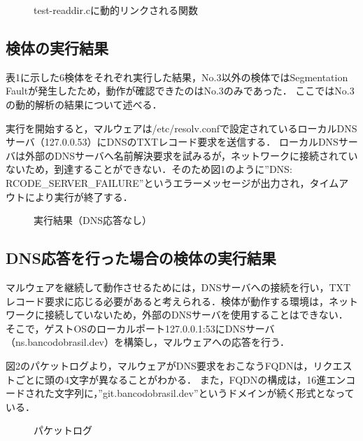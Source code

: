\documentclass[submit,techreq,noauthor]{eco}	%
\begin{document}
\begin{figure}[H]
	\centering
	\caption{test-readdir.cに動的リンクされる関数}
	\label{fig:ltrace}
\end{figure}

\subsection{検体の実行結果}
表1に示した6検体をそれぞれ実行した結果，No.3以外の検体ではSegmentation Faultが発生したため，動作が確認できたのはNo.3のみであった．
ここではNo.3の動的解析の結果について述べる．

実行を開始すると，マルウェアは/etc/resolv.confで設定されているローカルDNSサーバ（127.0.0.53）にDNSのTXTレコード要求を送信する．
ローカルDNSサーバは外部のDNSサーバへ名前解決要求を試みるが，ネットワークに接続されていないため，到達することができない．そのため図1のように”DNS: RCODE\_SERVER\_FAILURE”というエラーメッセージが出力され，タイムアウトにより実行が終了する．

\begin{figure}[H]
	\centering
	\caption{実行結果（DNS応答なし）}
	\label{fig:001}
\end{figure}

\subsection{DNS応答を行った場合の検体の実行結果}
マルウェアを継続して動作させるためには，DNSサーバへの接続を行い，TXTレコード要求に応じる必要があると考えられる．検体が動作する環境は，ネットワークに接続していないため，外部のDNSサーバを使用することはできない．
そこで，ゲストOSのローカルポート127.0.0.1:53にDNSサーバ（ns.bancodobrasil.dev）を構築し，マルウェアへの応答を行う．

図2のパケットログより，マルウェアがDNS要求をおこなうFQDNは，リクエストごとに頭の4文字が異なることがわかる．
また，FQDNの構成は，16進エンコードされた文字列に，”git.bancodobrasil.dev”というドメインが続く形式となっている．
\begin{figure}[H]
	\centering
	\caption{パケットログ}
	\label{fig:packet}
\end{figure}
\end{document}

